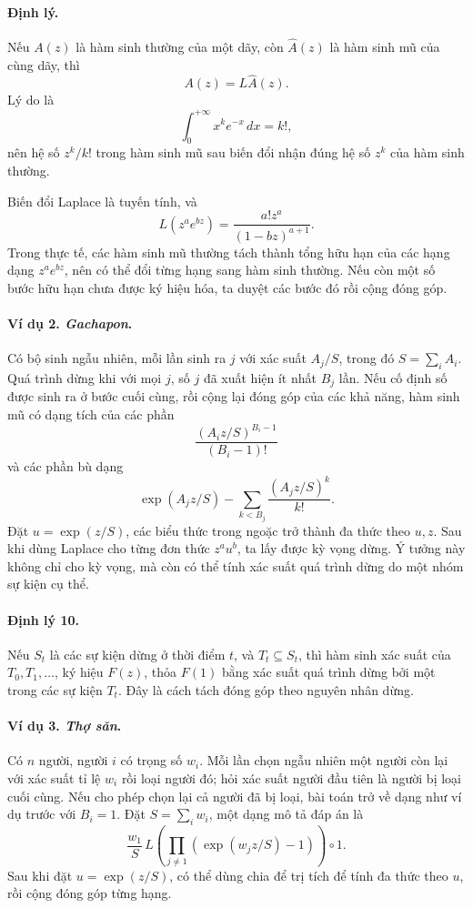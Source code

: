 \documentclass[11pt]{article}
\begin{document}
\paragraph{Định lý.}
Nếu \(A(z)\) là hàm sinh thường của một dãy, còn \(\widehat A(z)\) là hàm sinh
mũ của cùng dãy, thì
\[
  A(z)=L\widehat A(z).
\]
Lý do là
\[
  \int_0^{+\infty}x^ke^{-x}\,dx=k!,
\]
nên hệ số \(z^k/k!\) trong hàm sinh mũ sau biến đổi nhận đúng hệ số \(z^k\) của
hàm sinh thường.

Biến đổi Laplace là tuyến tính, và
\[
  L(z^ae^{bz})=\frac{a!z^a}{(1-bz)^{a+1}}.
\]
Trong thực tế, các hàm sinh mũ thường tách thành tổng hữu hạn của các hạng dạng
\(z^ae^{bz}\), nên có thể đổi từng hạng sang hàm sinh thường. Nếu còn một số
bước hữu hạn chưa được ký hiệu hóa, ta duyệt các bước đó rồi cộng đóng góp.

\paragraph{Ví dụ 2. \emph{Gachapon}.}
Có bộ sinh ngẫu nhiên, mỗi lần sinh ra \(j\) với xác suất \(A_j/S\), trong đó
\(S=\sum_i A_i\). Quá trình dừng khi với mọi \(j\), số \(j\) đã xuất hiện ít
nhất \(B_j\) lần. Nếu cố định số được sinh ra ở bước cuối cùng, rồi cộng lại
đóng góp của các khả năng, hàm sinh mũ có dạng tích của các phần
\[
  \frac{(A_iz/S)^{B_i-1}}{(B_i-1)!}
\]
và các phần bù dạng
\[
  \exp(A_jz/S)-\sum_{k<B_j}\frac{(A_jz/S)^k}{k!}.
\]
Đặt \(u=\exp(z/S)\), các biểu thức trong ngoặc trở thành đa thức theo \(u,z\).
Sau khi dùng Laplace cho từng đơn thức \(z^au^b\), ta lấy được kỳ vọng dừng.
Ý tưởng này không chỉ cho kỳ vọng, mà còn có thể tính xác suất quá trình dừng
do một nhóm sự kiện cụ thể.

\paragraph{Định lý 10.}
Nếu \(S_t\) là các sự kiện dừng ở thời điểm \(t\), và \(T_t\subseteq S_t\), thì
hàm sinh xác suất của \(T_0,T_1,\ldots\), ký hiệu \(F(z)\), thỏa \(F(1)\) bằng
xác suất quá trình dừng bởi một trong các sự kiện \(T_t\). Đây là cách tách
đóng góp theo nguyên nhân dừng.

\paragraph{Ví dụ 3. \emph{Thợ săn}.}
Có \(n\) người, người \(i\) có trọng số \(w_i\). Mỗi lần chọn ngẫu nhiên một
người còn lại với xác suất tỉ lệ \(w_i\) rồi loại người đó; hỏi xác suất người
đầu tiên là người bị loại cuối cùng. Nếu cho phép chọn lại cả người đã bị loại,
bài toán trở về dạng như ví dụ trước với \(B_i=1\). Đặt \(S=\sum_i w_i\), một
dạng mô tả đáp án là
\[
  \frac{w_1}{S}\,
  L\left(\prod_{j\ne 1}(\exp(w_jz/S)-1)\right)\circ 1.
\]
Sau khi đặt \(u=\exp(z/S)\), có thể dùng chia để trị tích để tính đa thức theo
\(u\), rồi cộng đóng góp từng hạng.
\end{document}
